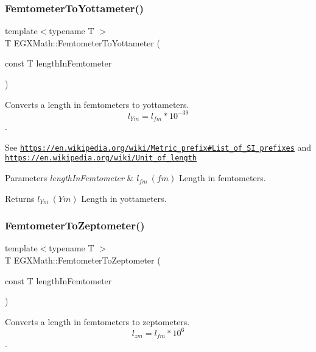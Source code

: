 \subsubsection{\texorpdfstring{Femtometer\+To\+Yottameter()}{FemtometerToYottameter()}}
{\footnotesize\ttfamily template$<$typename T $>$ \\
T E\+G\+X\+Math\+::\+Femtometer\+To\+Yottameter (\begin{DoxyParamCaption}\item[{const T}]{length\+In\+Femtometer }\end{DoxyParamCaption})}



Converts a length in femtometers to yottameters. \[ l_{Ym}=l_{fm} * 10^{-39} \]. 

See \href{https://en.wikipedia.org/wiki/Metric_prefix#List_of_SI_prefixes}{\tt https\+://en.\+wikipedia.\+org/wiki/\+Metric\+\_\+prefix\#\+List\+\_\+of\+\_\+\+S\+I\+\_\+prefixes} and \href{https://en.wikipedia.org/wiki/Unit_of_length}{\tt https\+://en.\+wikipedia.\+org/wiki/\+Unit\+\_\+of\+\_\+length} 
\begin{DoxyParams}{Parameters}
{\em length\+In\+Femtometer} & $ l_{fm}\ (fm)$ Length in femtometers. \\
\hline
\end{DoxyParams}
\begin{DoxyReturn}{Returns}
$ l_{Ym}\ (Ym)$ Length in yottameters. 
\end{DoxyReturn}
\mbox{\label{group___e_g_x_math-_conversions-_length_conversions-_femtometer-_s_i_ga9bcc5cf611f6646652effc080ce29f1a}} 
\subsubsection{\texorpdfstring{Femtometer\+To\+Zeptometer()}{FemtometerToZeptometer()}}
{\footnotesize\ttfamily template$<$typename T $>$ \\
T E\+G\+X\+Math\+::\+Femtometer\+To\+Zeptometer (\begin{DoxyParamCaption}\item[{const T}]{length\+In\+Femtometer }\end{DoxyParamCaption})}



Converts a length in femtometers to zeptometers. \[ l_{zm}=l_{fm} * 10^{6} \]. 

